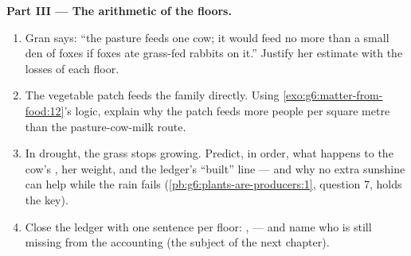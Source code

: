 \begin{problem}
\medskip\noindent\textbf{Part III --- The arithmetic of the
floors.}
\begin{enumerate}[resume]
  \item Gran says: ``the pasture feeds one cow; it would
        feed no more than a small den of foxes if foxes ate
        grass-fed rabbits on it.'' Justify her estimate
        with the losses of each floor.
  \item The vegetable patch feeds the family directly.
        Using \cref{exo:g6:matter-from-food:12}'s logic,
        explain why the patch feeds more people per square
        metre than the pasture-cow-milk route.
  \item In drought, the grass stops growing. Predict, in
        order, what happens to the cow's , her weight,
        and the ledger's ``built'' line --- and why no
        extra sunshine can help while the rain fails
        (\cref{pb:g6:plants-are-producers:1}, question 7,
        holds the key).
  \item Close the ledger with one sentence per floor:
        ,  --- and name who is still
        missing from the accounting (the subject of the
        next chapter).
\end{enumerate}
\end{problem}
